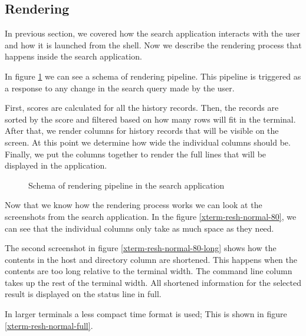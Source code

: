 \subsection{Rendering}

In previous section, we covered how the search application interacts with the user and how it is launched from the shell. Now we describe the rendering process that happens inside the search application.


In figure \ref{impl-search-app-render-pipeline} we can see a schema of rendering pipeline. This pipeline is triggered as a response to any change in the search query made by the user. 


First, scores are calculated for all the history records. Then, the records are sorted by the score and filtered based on how many rows will fit in the terminal. After that, we render columns for history records that will be visible on the screen. At this point we determine how wide the individual columns should be. Finally, we put the columns together to render the full lines that will be displayed in the application.


\begin{figure}[h!]
\centering
  \caption{Schema of rendering pipeline in the search application}
  \label{impl-search-app-render-pipeline}
\end{figure}



Now that we know how the rendering process works we can look at the screenshots from the search application. In the figure \ref{xterm-resh-normal-80}, we can see that the individual columns only take as much space as they need. 

The second screenshot in figure \ref{xterm-resh-normal-80-long} shows how the contents in the host and directory column are shortened. This happens when the contents are too long relative to the terminal width. The command line column takes up the rest of the terminal width. All shortened information for the selected result is displayed on the status line in full. 

In larger terminals a less compact time format is used; This is shown in figure \ref{xterm-resh-normal-full}.


